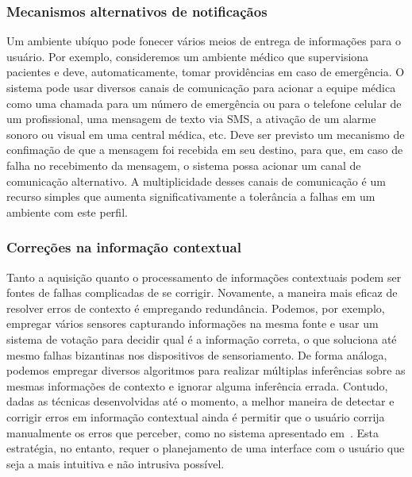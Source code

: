 
\subsubsection*{Mecanismos alternativos de notificaçãos} %

Um ambiente ubíquo pode fonecer vários meios de entrega de informações para o usuário. Por exemplo, consideremos um ambiente médico que supervisiona pacientes e deve, automaticamente, tomar providências em caso de emergência. O sistema pode usar diversos canais de comunicação para acionar a equipe médica como uma chamada para um número de emergência ou para o telefone celular de um profissional, uma mensagem de texto via SMS, a ativação de um alarme sonoro ou visual em uma central médica, etc. Deve ser previsto um mecanismo de confimação de que a mensagem foi recebida em seu destino, para que, em caso de falha no recebimento da mensagem, o sistema possa acionar um canal de comunicação alternativo. A multiplicidade desses canais de comunicação é um recurso simples que aumenta significativamente a tolerância a falhas em um ambiente com este perfil.


\subsubsection*{Correções na informação contextual} %

Tanto a aquisição quanto o processamento de informações contextuais podem ser fontes de falhas complicadas de se corrigir. Novamente, a maneira mais eficaz de resolver erros de contexto é empregando redundância. Podemos, por exemplo, empregar vários sensores capturando informações na mesma fonte e usar um sistema de votação para decidir qual é a informação correta, o que soluciona até mesmo falhas bizantinas nos dispositivos de sensoriamento. De forma análoga, podemos empregar diversos algoritmos para realizar múltiplas inferências sobre as mesmas informações de contexto e ignorar alguma inferência errada. Contudo, dadas as técnicas desenvolvidas até o momento, a melhor maneira de detectar e corrigir erros em informação contextual ainda é permitir que o usuário corrija manualmente os erros que perceber, como no sistema apresentado em~\cite{dey2002distributed}. Esta estratégia, no entanto, requer o planejamento de uma interface com o usuário que seja a mais intuitiva e não intrusiva possível.

